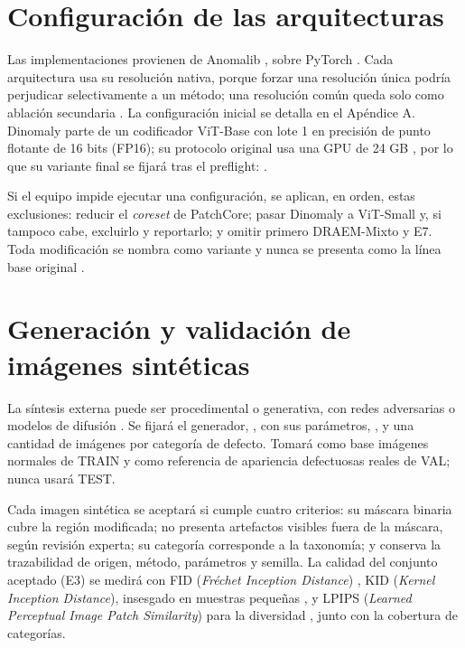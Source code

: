 \documentclass[12pt,oneside]{report}
\begin{document}
\section{Configuración de las arquitecturas}

Las implementaciones provienen de Anomalib \cite{akcay2022}, sobre PyTorch \cite{paszke2019}. Cada arquitectura usa su resolución nativa, porque forzar una resolución única podría perjudicar selectivamente a un método; una resolución común queda solo como ablación secundaria \cite{paez2026}. La configuración inicial se detalla en el Apéndice A. Dinomaly parte de un codificador ViT-Base con lote 1 en precisión de punto flotante de 16 bits (FP16); su protocolo original usa una GPU de 24 GB \cite{guo2025supp}, por lo que su variante final se fijará tras el preflight: .

Si el equipo impide ejecutar una configuración, se aplican, en orden, estas exclusiones: reducir el \textit{coreset} de PatchCore; pasar Dinomaly a ViT-Small y, si tampoco cabe, excluirlo y reportarlo; y omitir primero DRAEM-Mixto y E7. Toda modificación se nombra como variante y nunca se presenta como la línea base original \cite{paez2026}.

\section{Generación y validación de imágenes sintéticas}
\label{sec:sintesis}

La síntesis externa puede ser procedimental \cite{li2021,schluter2022} o generativa, con redes adversarias \cite{duan2023,goodfellow2014} o modelos de difusión \cite{hu2024,ho2020}. Se fijará el generador, , con sus parámetros, , y una cantidad de  imágenes por categoría de defecto. Tomará como base imágenes normales de TRAIN y como referencia de apariencia defectuosas reales de VAL; nunca usará TEST.

Cada imagen sintética se aceptará si cumple cuatro criterios: su máscara binaria cubre la región modificada; no presenta artefactos visibles fuera de la máscara, según revisión experta; su categoría corresponde a la taxonomía; y conserva la trazabilidad de origen, método, parámetros y semilla. La calidad del conjunto aceptado (E3) se medirá con FID (\textit{Fréchet Inception Distance}) \cite{heusel2017}, KID (\textit{Kernel Inception Distance}), insesgado en muestras pequeñas \cite{binkowski2018}, y LPIPS (\textit{Learned Perceptual Image Patch Similarity}) para la diversidad \cite{zhang2018,duan2023,hu2024}, junto con la cobertura de categorías.
\end{document}
